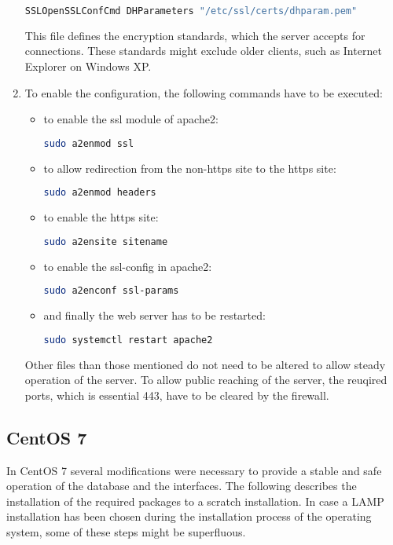 \begin{enumerate}
\begin{lstlisting}[language=bash]
   SSLOpenSSLConfCmd DHParameters "/etc/ssl/certs/dhparam.pem"
  \end{lstlisting}
  This file defines the encryption standards, which the server accepts for connections. These standards might exclude older clients, such as Internet Explorer on Windows XP.
  \item To enable the configuration, the following commands have to be executed:
  \begin{itemize}
  \item to enable the ssl module of apache2:
  \begin{lstlisting}[language=bash]
   sudo a2enmod ssl
  \end{lstlisting}
  \item to allow redirection from the non-https site to the https site:
  \begin{lstlisting}[language=bash]
   sudo a2enmod headers
  \end{lstlisting}
  \item to enable the https site:
  \begin{lstlisting}[language=bash]
   sudo a2ensite sitename
  \end{lstlisting}
  \item to enable the ssl-config in apache2:
  \begin{lstlisting}[language=bash]
   sudo a2enconf ssl-params
  \end{lstlisting}
  \item and finally the web server has to be restarted:
  \begin{lstlisting}[language=bash]
   sudo systemctl restart apache2
  \end{lstlisting}
  \end{itemize}
  Other files than those mentioned do not need to be altered to allow steady operation of the server. To allow public reaching of the server, the reuqired ports, which is essential 443, have to be cleared by the firewall.
\end{enumerate}

\subsection{CentOS 7}
In CentOS 7 several modifications were necessary to provide a stable and safe operation of the database and the interfaces. The following describes the installation of the required
packages to a scratch installation. In case a LAMP installation has been chosen during the installation process of the operating system, some of these steps might be superfluous. 

